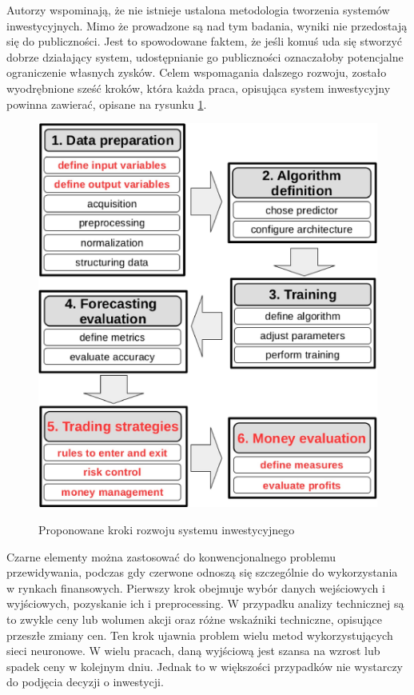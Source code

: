 \documentclass[twoside]{iisthesis}
\begin{document}
Autorzy wspominają, że nie istnieje ustalona metodologia tworzenia systemów inwestycyjnych. Mimo że prowadzone są nad tym badania, wyniki nie przedostają się do publiczności. Jest to spowodowane faktem, że jeśli komuś uda się stworzyć dobrze działający system, udostępnianie go publiczności oznaczałoby potencjalne ograniczenie własnych zysków. Celem wspomagania dalszego rozwoju, zostało wyodrębnione sześć kroków, która każda praca, opisująca system inwestycyjny powinna zawierać, opisane na rysunku \ref{fig:metodyka}.

\begin{figure}[h]
\caption{Proponowane kroki rozwoju systemu inwestycyjnego}
\centering
\includegraphics{metodyka.jpg}
\label{fig:metodyka}
\end{figure}

Czarne elementy można zastosować do konwencjonalnego problemu przewidywania, podczas gdy czerwone odnoszą się szczególnie do wykorzystania w rynkach finansowych. Pierwszy krok obejmuje wybór danych wejściowych i wyjściowych, pozyskanie ich i preprocessing. W przypadku analizy technicznej są to zwykle ceny lub wolumen akcji oraz różne wskaźniki techniczne, opisujące przeszłe zmiany cen. Ten krok ujawnia problem wielu metod wykorzystujących sieci neuronowe. W wielu pracach, daną wyjściową jest szansa na wzrost lub spadek ceny w kolejnym dniu. Jednak to w większości przypadków nie wystarczy do podjęcia decyzji o inwestycji.
\end{document}
